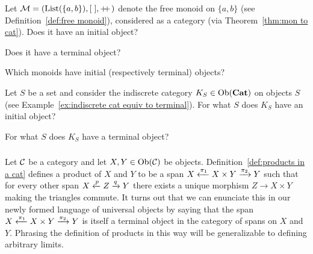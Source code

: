 \documentclass[CT4S-EN-RU]{subfiles}
\begin{document}
\begin{exerciseENG}
Let $\mathcal{M}=(\textnormal{List}(\{a,b\}),[\;],+\!\!+\hspace{1pt})$ denote the free monoid on $\{a,b\}$ (see Definition~\ref{def:free monoid}), considered as a category (via Theorem~\ref{thm:mon to cat}).
\sexc Does it have an initial object?
\item Does it have a terminal object?
\item Which monoids have initial (respectively terminal) objects?
\endsexc
\end{exerciseENG}

\begin{exerciseRUS}
\end{exerciseRUS}

\begin{exerciseENG}
Let $S$ be a set and consider the indiscrete category $K_S\in\textnormal{Ob}({\mathbf{Cat}})$ on objects $S$ (see Example~\ref{ex:indiscrete cat equiv to terminal}).
\sexc For what $S$ does $K_S$ have an initial object?
\item For what $S$ does $K_S$ have a terminal object?
\endsexc
\end{exerciseENG}

\begin{exerciseRUS}
\end{exerciseRUS}


\subsubsection{}\label{sec:examples of limits}

\begin{blockENG}
Let $\mathcal{C}$ be a category and let $X,Y\in\textnormal{Ob}(\mathcal{C})$ be objects. Definition~\ref{def:products in a cat} defines a product  of $X$ and $Y$ to be a span $X\xleftarrow{\pi_1}X\times Y\xrightarrow{\pi_2}Y$ such that for every other span $X\xleftarrow{p}Z\xrightarrow{q}Y$ there exists a unique morphism $Z\to X\times Y$ making the triangles commute. It turns out that we can enunciate this in our newly formed language of universal objects by saying that the span $X\xleftarrow{\pi_1}X\times Y\xrightarrow{\pi_2}Y$ is itself a terminal object in the category of spans on $X$ and $Y.$ Phrasing the definition of products in this way will be generalizable to defining arbitrary limits.
\end{blockENG}

\begin{blockRUS}
\end{blockRUS}
\end{document}

